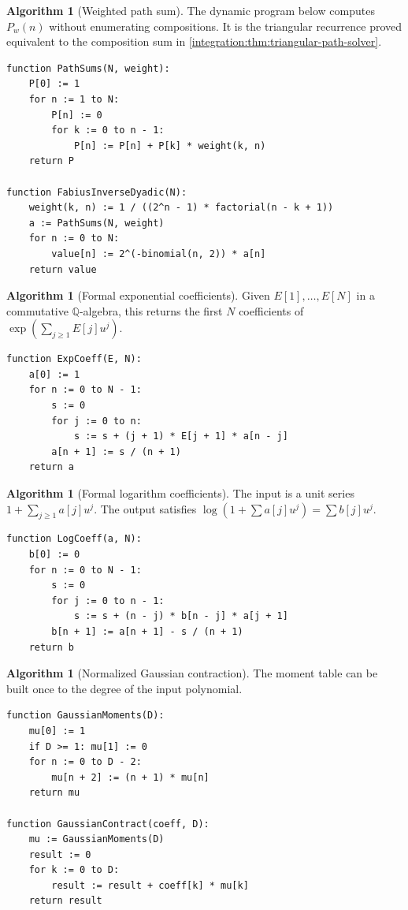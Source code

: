\documentclass[11pt,oneside]{article}
\theoremstyle{definition}
\newtheorem{algorithm}[theorem]{Algorithm}
\theoremstyle{remark}
\newcommand{\Q}{\mathbb Q}
\begin{document}
\begin{algorithm}[Weighted path sum]
\label{integration:alg:path-sum}
The dynamic program below computes $P_w(n)$ without enumerating compositions.  It is the
triangular recurrence proved equivalent to the composition sum in
\cref{integration:thm:triangular-path-solver}.
\end{algorithm}
\begin{lstlisting}[style=pseudo]
function PathSums(N, weight):
    P[0] := 1
    for n := 1 to N:
        P[n] := 0
        for k := 0 to n - 1:
            P[n] := P[n] + P[k] * weight(k, n)
    return P

function FabiusInverseDyadic(N):
    weight(k, n) := 1 / ((2^n - 1) * factorial(n - k + 1))
    a := PathSums(N, weight)
    for n := 0 to N:
        value[n] := 2^(-binomial(n, 2)) * a[n]
    return value
\end{lstlisting}

\begin{algorithm}[Formal exponential coefficients]
\label{integration:alg:expcoeff}
Given $E[1],\ldots,E[N]$ in a commutative $\Q$-algebra, this returns the first $N$
coefficients of $\exp(\sum_{j\ge1}E[j]u^j)$.
\end{algorithm}
\begin{lstlisting}[style=pseudo]
function ExpCoeff(E, N):
    a[0] := 1
    for n := 0 to N - 1:
        s := 0
        for j := 0 to n:
            s := s + (j + 1) * E[j + 1] * a[n - j]
        a[n + 1] := s / (n + 1)
    return a
\end{lstlisting}

\begin{algorithm}[Formal logarithm coefficients]
\label{integration:alg:logcoeff}
The input is a unit series $1+\sum_{j\ge1}a[j]u^j$.  The output satisfies
$\log(1+\sum a[j]u^j)=\sum b[j]u^j$.
\end{algorithm}
\begin{lstlisting}[style=pseudo]
function LogCoeff(a, N):
    b[0] := 0
    for n := 0 to N - 1:
        s := 0
        for j := 0 to n - 1:
            s := s + (n - j) * b[n - j] * a[j + 1]
        b[n + 1] := a[n + 1] - s / (n + 1)
    return b
\end{lstlisting}

\begin{algorithm}[Normalized Gaussian contraction]
\label{integration:alg:gaussian-contraction}
The moment table can be built once to the degree of the input polynomial.
\end{algorithm}
\begin{lstlisting}[style=pseudo]
function GaussianMoments(D):
    mu[0] := 1
    if D >= 1: mu[1] := 0
    for n := 0 to D - 2:
        mu[n + 2] := (n + 1) * mu[n]
    return mu

function GaussianContract(coeff, D):
    mu := GaussianMoments(D)
    result := 0
    for k := 0 to D:
        result := result + coeff[k] * mu[k]
    return result
\end{lstlisting}
\end{document}
